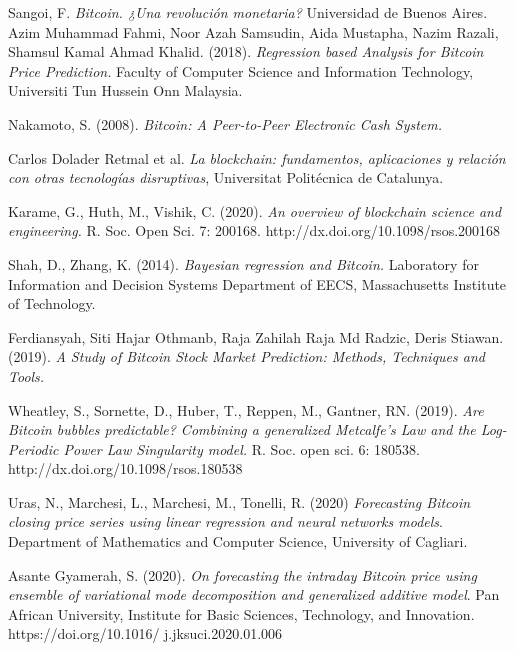 \documentclass[a4paper,12pt,twocolumn]{article}
\begin{document}
\newpage  
\onecolumn              
%
\begin{thebibliography}{99}

Sangoi, F.
{\em Bitcoin. ¿Una revolución monetaria?}
Universidad de Buenos Aires.
%
Azim Muhammad Fahmi, Noor Azah Samsudin, Aida Mustapha, 
Nazim Razali, Shamsul Kamal Ahmad Khalid. (2018).
{\em Regression based Analysis for Bitcoin Price Prediction.}
Faculty of Computer Science and Information Technology, Universiti Tun Hussein Onn Malaysia.

Nakamoto, S. (2008).
{\em Bitcoin: A Peer-to-Peer Electronic Cash System.}

Carlos Dolader Retmal et al.
{\em La blockchain: fundamentos, aplicaciones y relación con otras tecnologías disruptivas}, Universitat Politécnica de Catalunya.

Karame, G., Huth, M., Vishik, C. (2020).
{\em An overview of blockchain science and
engineering.} R. Soc. Open Sci. 7: 200168.
http://dx.doi.org/10.1098/rsos.200168


Shah, D., Zhang, K. (2014).
{\em Bayesian regression and Bitcoin.} 
Laboratory for Information and Decision Systems
Department of EECS, Massachusetts Institute of Technology.


Ferdiansyah, Siti Hajar Othmanb, Raja Zahilah Raja Md Radzic, Deris Stiawan. (2019).
{\em A Study of Bitcoin Stock Market Prediction: Methods, Techniques and Tools.} 

Wheatley, S., Sornette, D., Huber, T., Reppen, M., Gantner, RN. (2019). 
{\em Are Bitcoin bubbles predictable? Combining a generalized
Metcalfe’s Law and the Log-Periodic Power Law
Singularity model.} R. Soc. open sci. 6: 180538.
http://dx.doi.org/10.1098/rsos.180538

Uras, N., Marchesi, L., Marchesi, M., Tonelli, R. (2020)
{\em Forecasting Bitcoin closing price series using linear
regression and neural networks models}. Department of Mathematics and Computer Science, University of Cagliari.

Asante Gyamerah, S. (2020).
{\em On forecasting the intraday Bitcoin price using ensemble of variational
mode decomposition and generalized additive model}. Pan African University, Institute for Basic Sciences, Technology, and Innovation.
https://doi.org/10.1016/
j.jksuci.2020.01.006



\end{thebibliography}
\end{document}

